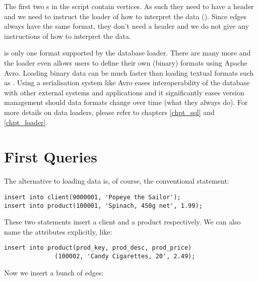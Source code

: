 The first two s in the script contain vertices.
As such they need to have a header and we need to instruct
the loader of how to interpret the data ().
Since edges always have the same format, they don't need a header
and we do not give any instructions of how to interpret the data.

 is only one format supported by the database loader.
There are many more and the loader even allows users to define
their own (binary) formats using Apache Avro. Loading binary data 
can be much faster than loading textual formats such as .
Using a serialisation system like Avro eases
interoperability of the database with other
external systems and applications and it
significantly eases version management should data formats
change over time (what they always do). 
For more details on data loaders, please refer to chapters
\ref{chpt_sql} and \ref{chpt_loader}.

\section{First Queries}
The alternative to loading data is, of course, the conventional
 statement:

\begin{sqlcode}
\begin{lstlisting}
insert into client(9000001, 'Popeye the Sailor');
insert into product(100001, 'Spinach, 450g net', 1.99);
\end{lstlisting}
\end{sqlcode}

These two statements insert a client and a product respectively.
We can also name the attributes explicitly, like:

\begin{sqlcode}
\begin{lstlisting}
insert into product(prod_key, prod_desc, prod_price)
              (100002, 'Candy Cigarettes, 20', 2.49);
\end{lstlisting}
\end{sqlcode}

Now we insert a bunch of edges:

